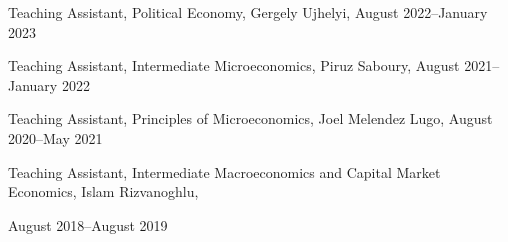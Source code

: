 \documentclass[10pt,letterpaper]{article}
\renewenvironment{itemize}{
  \begin{list}{}{
    \setlength{\leftmargin}{1.5em}
  }
}{
  \end{list}
}
\begin{document}
\begin{itemize}
\begin{itemize}
\item Teaching Assistant, Political Economy, Gergely Ujhelyi,
  August 2022--January 2023
\item Teaching Assistant, Intermediate Microeconomics, Piruz Saboury,
  August 2021--January 2022
\item Teaching Assistant, Principles of Microeconomics, Joel Melendez Lugo,
  August 2020--May 2021
\item Teaching Assistant, Intermediate Macroeconomics and  Capital Market Economics, Islam Rizvanoghlu, 

\qquad August 2018--August 2019
\end{itemize}


\end{itemize}
\end{document}

